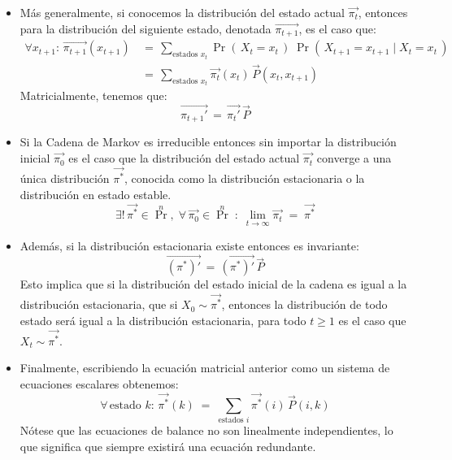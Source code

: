 \documentclass[ 10pt, xcolor = dvipsnames]{beamer}
\begin{document}
\begin{frame}[allowframebreaks]
\begin{itemize}
\item M\'as generalmente, si conocemos la distribuci\'on del estado actual $\vec{\pi_t}$, entonces para la distribuci\'on del siguiente estado, denotada $\vec{\pi_{t+1}}$, \linebreak es el caso que: 
\begin{align*}
\forall x_{t+1} \colon \, \vec{\pi_{t+1}}(x_{t+1}) \, 
& = \, \sum_{\text{estados } x_t} \Pr( \, X_t = x_t \, ) \; \Pr( \, X_{t+1} = x_{t+1} \mid X_t = x_t \, ) \\[1ex]
& = \, \sum_{\text{estados } x_t} \vec{\pi_t}(x_t) \, \vec{P}(x_t,x_{t+1})
\end{align*}
Matricialmente, tenemos que: 
\[
\vec{\pi_{t+1}'} \, = \, \vec{\pi_t'} \, \vec{P}
\]
\end{itemize}
\framebreak

\begin{itemize}
\item Si la Cadena de Markov es irreducible entonces sin importar la distribuci\'on inicial $\vec{\pi_0}$ es el caso que la distribuci\'on del estado actual $\vec{\pi_t}$ converge a una \'unica distribuci\'on $\vec{\pi^*}$, conocida como la distribuci\'on estacionaria o la distribuci\'on en estado estable. \Iec 
\[
\exists! \, \vec{\pi^*} \in \Pr^n, \; \forall \, \vec{\pi_0} \in \Pr^n \; \colon \;
\lim_{ t \rightarrow \infty } \vec{\pi_t} \; = \;
\vec{\pi^*}
\]
\item Adem\'as, si la distribuci\'on estacionaria existe entonces es invariante: 
\[
\vec{(\pi^*)'} \, = \, \vec{(\pi^*)'} \, \vec{P}
\]
Esto implica que si la distribuci\'on del estado inicial de la cadena es igual a \linebreak la distribuci\'on estacionaria, \ie que si $X_0 \sim \vec{\pi^*}$, entonces la distribuci\'on de todo estado ser\'a igual a la distribuci\'on estacionaria, \ie para todo $t \geq 1$ \linebreak es el caso que $X_t \sim \vec{\pi^*}$. 
\item Finalmente, escribiendo la ecuaci\'on matricial anterior como un sistema de ecuaciones escalares obtenemos: 
\[
\forall \, \text{estado } k \colon \, \vec{\pi^*}(k) \; = \; 
\sum_{\text{estados }i} \vec{\pi^*}(i) \, \vec{P}(i,k) 
\]
N\'otese que las ecuaciones de balance no son linealmente independientes, \linebreak lo que significa que siempre existir\'a una ecuaci\'on redundante. 
\end{itemize}

\end{frame}
\end{document}
